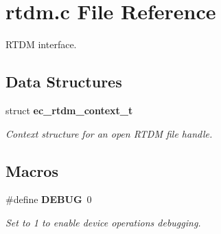 \section{rtdm.\-c File Reference}
\label{rtdm_8c}


R\-T\-D\-M interface.  


\subsection*{Data Structures}
\begin{DoxyCompactItemize}
\item 
struct {\bf ec\-\_\-rtdm\-\_\-context\-\_\-t}
\begin{DoxyCompactList}\small\item\em Context structure for an open R\-T\-D\-M file handle. \end{DoxyCompactList}\end{DoxyCompactItemize}
\subsection*{Macros}
\begin{DoxyCompactItemize}
\item 
\#define {\bf D\-E\-B\-U\-G}~0\label{rtdm_8c_ad72dbcf6d0153db1b8d8a58001feed83}

\begin{DoxyCompactList}\small\item\em Set to 1 to enable device operations debugging. \end{DoxyCompactList}\end{DoxyCompactItemize}
